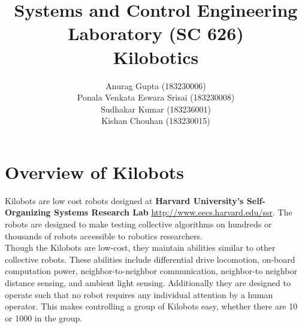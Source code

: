 \documentclass{report}[12pt]
\author{Anurag Gupta (183230006) \\ Ponala Venkata Eswara Srisai
(183230008)\\ Sudhakar Kumar (183236001)\\ Kishan Chouhan (183230015)}
\title{Systems and Control Engineering Laboratory (SC 626) \\ Kilobotics}
\begin{document}
\maketitle
\tableofcontents
\thispagestyle{empty}
\mbox{}
\newpage

\chapter{Overview of Kilobots}

Kilobots are low cost robots designed at \textbf{Harvard University's Self-Organizing Systems Research Lab} \url{http://www.eecs.harvard.edu/ssr}. The robots are designed to make testing collective algorithms on hundreds or thousands of robots accessible to robotics researchers.\\

Though the Kilobots are low-cost, they maintain abilities similar to other collective robots. These abilities include differential drive locomotion, on-board computation power, neighbor-to-neighbor communication, neighbor-to neighbor distance sensing, and ambient light sensing. Additionally they are designed to operate such that no robot requires any individual attention by a human operator. This makes controlling a group of Kilobots easy, whether there are 10 or 1000 in the group.
 
\end{document}
